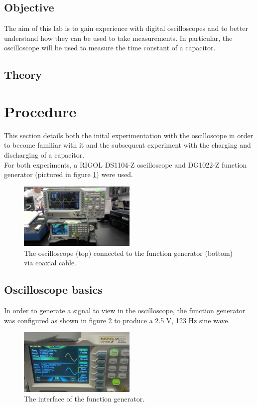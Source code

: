 \documentclass{article}
\begin{document}
    \subsection{Objective}
    The aim of this lab is to gain experience with digital oscilloscopes and to better understand how they can be used to take measurements. In particular, the oscilloscope will be used to measure the time constant of a capacitor.

    \subsection{Theory}\label{theory}
    

\section{Procedure}
    This section details both the inital experimentation with the oscilloscope in order to become familiar with it and the subsequent experiment with the charging and discharging of a capacitor.\\ %
    For both experiments, a RIGOL DS1104-Z oscilloscope and DG1022-Z function generator (pictured in figure \ref{oscnfunc1}) were used.

    \begin{figure}
        \centering
        \includegraphics[width=0.5\textwidth]{WIN_20240927_13_48_12_Pro.jpg} %
        \caption{The oscilloscope (top) connected to the function generator (bottom) via coaxial cable.}
        \label{oscnfunc1}
    \end{figure}

    \subsection{Oscilloscope basics}
        In order to generate a signal to view in the oscilloscope, the function generator was configured as shown in figure \ref{funcgen1} to produce a 2.5 V, 123 Hz sine wave.

        \begin{figure}
            \centering
            \includegraphics[width=0.5\textwidth]{WIN_20240927_13_51_59_Pro.jpg}
            \caption{The interface of the function generator.}
            \label{funcgen1}
        \end{figure}
\end{document}
